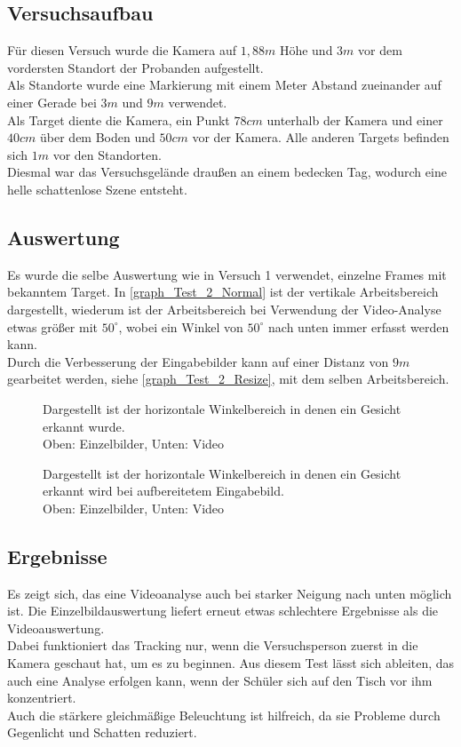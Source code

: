 \subsection{Versuchsaufbau}
Für diesen Versuch wurde die Kamera auf $1,88m$ Höhe und $3m$ vor dem vordersten Standort der Probanden aufgestellt.\\
Als Standorte wurde eine Markierung mit einem Meter Abstand zueinander auf einer Gerade bei $3m$ und $9m$ verwendet.\\
Als Target diente die Kamera, ein Punkt $78cm$ unterhalb der Kamera und einer $40cm$ über dem Boden und $50cm$ vor der Kamera. Alle anderen Targets befinden sich $1m$ vor den Standorten.\\
Diesmal war das Versuchsgelände draußen an einem bedecken Tag, wodurch eine helle schattenlose Szene entsteht.
\subsection{Auswertung}
Es wurde die selbe Auswertung wie in Versuch 1 verwendet, einzelne Frames mit bekanntem Target. In \autoref{graph_Test_2_Normal} ist der vertikale Arbeitsbereich dargestellt, wiederum ist der Arbeitsbereich bei Verwendung der Video-Analyse etwas größer mit $50^\circ$, wobei ein Winkel von $50^\circ$ nach unten immer erfasst werden kann.\\
Durch die Verbesserung der Eingabebilder kann auf einer Distanz von $9m$ gearbeitet werden, siehe \autoref{graph_Test_2_Resize}, mit dem selben Arbeitsbereich.
\begin{figure}
	\centering
		
	\caption{Dargestellt ist der horizontale Winkelbereich in denen ein Gesicht erkannt wurde.\\
		Oben: Einzelbilder, Unten: Video}
	\label{graph_Test_2_Normal}
\end{figure}
\begin{figure}
\centering
	
	\caption{Dargestellt ist der horizontale Winkelbereich in denen ein Gesicht erkannt wird bei aufbereitetem Eingabebild.\\
	Oben: Einzelbilder, Unten: Video}
\label{graph_Test_2_Resize}
\end{figure}
\subsection{Ergebnisse}
Es zeigt sich, das eine Videoanalyse auch bei starker Neigung nach unten möglich ist. Die Einzelbildauswertung liefert erneut etwas schlechtere Ergebnisse als die Videoauswertung.\\
Dabei funktioniert das Tracking nur, wenn die Versuchsperson zuerst in die Kamera geschaut hat, um es zu beginnen. Aus diesem Test lässt sich ableiten, das auch eine Analyse erfolgen kann, wenn der Schüler sich auf den Tisch vor ihm konzentriert.\\
Auch die stärkere gleichmäßige Beleuchtung ist hilfreich, da sie Probleme durch Gegenlicht und Schatten reduziert.
